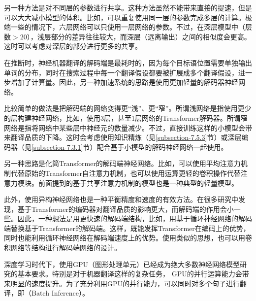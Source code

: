 \parinterval 另一种方法是对不同层的参数进行共享。这种方法虽然不能带来直接的提速，但是可以大大减小模型的体积。比如，可以重复使用同一层的参数完成多层的计算。极端一些的情况下，六层网络可以只使用一层网络的参数\cite{DBLP:conf/aaai/DabreF19}。不过，在深层模型中（层数$>20$），浅层部分的差异往往较大，而深层（远离输出）之间的相似度会更高。这时可以考虑对深层的部分进行更多的共享。

\vspace{0.5em}
\vspace{0.5em}

\parinterval 在推断时，神经机器翻译的解码端是最耗时的，因为每个目标语位置需要单独输出单词的分布，同时在搜索过程中每一个翻译假设都要被扩展成多个翻译假设，进一步增加了计算量。因此，另一种加速系统的思路是使用更加轻量的解码器神经网络。

\parinterval 比较简单的做法是把解码端的网络变得更``浅''、更``窄''。所谓浅网络是指使用更少的层构建神经网络，比如，使用3层，甚至1层网络的Transformer解码器。所谓窄网络是指将网络中某些层中神经元的数量减少。不过，直接训练这样的小模型会带来翻译品质的下降。这时会考虑使用知识精炼（见\ref{subsection-7.5.3}节）或深层编码器（见\ref{subsection-7.3.1}节）配合基于小模型的解码神经网络一起使用。

\parinterval 另一种思路是化简Transformer的解码端神经网络。比如，可以使用平均注意力机制代替原始的Transformer自注意力机制\cite{DBLP:journals/corr/abs-1805-00631}，也可以使用运算更轻的卷积操作代替注意力模块\cite{Wu2019PayLA}。前面提到的基于共享注意力机制的模型也是一种典型的轻量模型\cite{Xiao2019SharingAW}。

\parinterval 此外，使用异构神经网络也是一种平衡精度和速度的有效方法。在很多研究中发现，基于Transformer的编码器对翻译品质的影响更大，而解码端的作用会小一些。因此，一种想法是用更快速的解码端结构，比如，用基于循环神经网络的解码端替换基于Transformer的解码端\cite{Chen2018TheBO}。这样，既能发挥Transformer在编码上的优势，同时也能利用循环神经网络在解码端速度上的优势。使用类似的思想，也可以用卷积网络等结构进行解码端网络的设计。

\vspace{0.5em}
\vspace{0.5em}

\parinterval 深度学习时代下，使用GPU（图形处理单元）已经成为绝大多数神经网络模型研究的基本要求。特别是对于机器翻译这样的复杂任务， GPU的并行运算能力会带来明显的速度提升。为了充分利用GPU的并行能力，可以同时对多个句子进行翻译，即{\small{}}（Batch Inference）。

